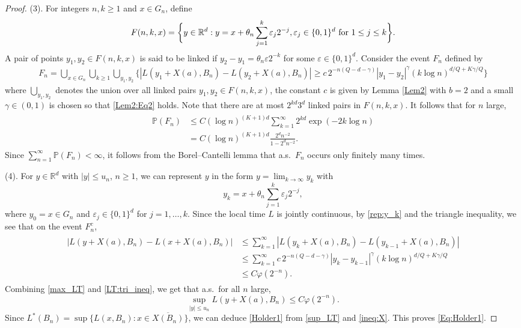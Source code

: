 \documentclass[11pt, reqno]{amsart}
\def\R{{\mathbb R}}
\def\P{{\mathbb P}}
\def\eps{\varepsilon}
\numberwithin{equation}{section}
\begin{document}
\begin{proof}
(3). For integers $n, k \ge 1$ and $x \in G_n$, define
\begin{equation*}
F(n,k,x) = \bigg\{ y \in \R^d : y = x + \theta_n \sum_{j=1}^k \eps_j 2^{-j}, \eps_j \in \{0, 1\}^d \textup{ for } 1 \le j \le k \bigg\}.
\end{equation*}
A pair of points $y_1, y_2 \in F(n,k,x)$ is said to be linked if $y_2 - y_1 = \theta_n \eps 2^{-k}$ for some $\eps \in \{0, 1\}^d$.
Consider the event $F_n$ defined by
\begin{align*}
F_n = \bigcup_{x \in G_n} \bigcup_{k\ge 1} \bigcup_{y_1, y_2} \Big\{ |L(y_1 + X(a), B_n) - L(y_2 + X(a), B_n)|
 \ge c\,2^{-n(Q-d-\gamma)} |y_1 - y_2|^{\gamma}(k\log n)^{d/Q + K\gamma/Q}\Big\}
\end{align*}
where $\bigcup_{y_1, y_2}$ denotes the union over all linked pairs $y_1, y_2 \in F(n,k,x)$, the constant $c$ is given 
by Lemma \ref{Lem2} with $b = 2$ and a small $\gamma \in (0, 1)$ is chosen so that \eqref{Lem2:Eq2} holds. Note 
that there are at most $2^{kd} 3^d$ linked pairs in $F(n,k,x)$.
It follows that for $n$ large,
\begin{align}
\begin{aligned}\label{P(F_n)}
\P(F_n) &\le C (\log n)^{(K+1)d} \sum_{k = 1}^\infty 2^{kd} \exp(-2k \log n)\\
& = C (\log n)^{(K+1)d} \frac{2^d n^{-2}}{1 - 2^d n^{-2}}.
\end{aligned}
\end{align}
Since $\sum_{n=1}^\infty \P(F_n) < \infty$, it follows from the Borel--Cantelli lemma that a.s.~$F_n$ occurs only finitely many times.

(4). For $y \in \R^d$ with $|y| \le u_n$, $n \ge 1$, we can represent $y$ in the form $y = \lim_{k \to \infty} y_k$ with
\begin{equation}\label{rep:y_k}
y_k = x + \theta_n \sum_{j=1}^k \eps_j 2^{-j},
\end{equation}
where $y_0 = x \in G_n$ and $\eps_j \in \{0, 1\}^d$ for $j = 1, \dots, k$. Since the local time $L$ is jointly continuous, by 
\eqref{rep:y_k} and the triangle inequality, we see that on the event $F_n^c$,
\begin{align}
\begin{aligned}\label{LT:tri_ineq}
|L(y + X(a), B_n) - L(x + X(a), B_n)|
& \le \sum_{k=1}^\infty |L(y_k + X(a), B_n) - L(y_{k-1}+ X(a), B_n)|\\
& \le \sum_{k=1}^\infty c\,2^{-n(Q-d-\gamma)} |y_k - y_{k-1}|^{\gamma} (k \log n)^{d/Q + K\gamma/Q}\\
&\le C \varphi(2^{-n}).
\end{aligned}
\end{align}
Combining \eqref{max_LT} and \eqref{LT:tri_ineq}, we get that a.s.~for all $n$ large, 
\begin{equation}\label{sup_LT}
\sup_{|y| \le u_n} L(y+ X(a), B_n) \le C \varphi(2^{-n}).
\end{equation}
Since $L^*(B_n) = \sup\{ L(x, B_n) : x \in \overline{X(B_n)} \}$, we can deduce \eqref{Holder1} from \eqref{sup_LT} 
and \eqref{ineq:X}. This proves \eqref{Eq:Holder1}.


\end{proof}
\end{document}

